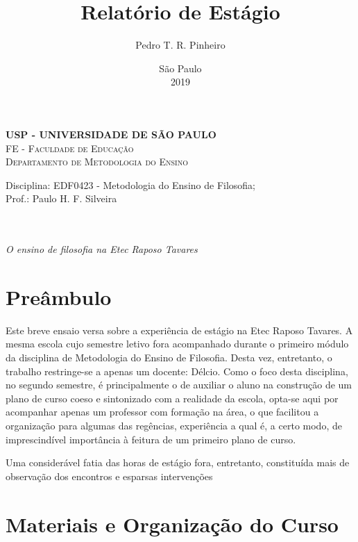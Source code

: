 \documentclass[12pt,a4paper]{article}
\author{Pedro T. R. Pinheiro}
\date{São Paulo\\2019}
\title{Relatório de Estágio}
\newcommand{\subtitulo}{O ensino de filosofia na Etec Raposo Tavares}
\newcommand{\disciplina}{EDF0423 - Metodologia do Ensino de Filosofia}
\newcommand{\departamento}{Departamento de Metodologia do Ensino}
\newcommand{\unidade}{FE - Faculdade de Educação}
\newcommand{\prof}{Paulo H. F. Silveira}
\begin{document}
	\begin{center}
				\textbf{
				\LARGE USP - UNIVERSIDADE DE SÃO PAULO \\
			}
			\Large \textsc{\unidade} \\
			\large \textsc{\departamento}\\
			\vspace*{1cm}
				
			Disciplina: \disciplina; \\Prof.: \prof
			\vfill
			\begin{center}
				{\Large \textsc{\theauthor}} \\ 
				\vspace{1cm}
				\LARGE\textbf{\thetitle} \\
				\Large\emph{\subtitulo}
			\end{center}
			\vfill
			\large\thedate
			\vspace*{1cm}
			\thispagestyle{empty}			
	\end{center}

	\newpage

	\setlength{\parskip}{0.5cm}
	\setlength{\parindent}{1.1cm}
	\onehalfspacing
	
	\section{Preâmbulo}
	
	Este breve ensaio versa sobre a experiência de estágio na Etec Raposo Tavares. A mesma escola cujo semestre letivo fora acompanhado durante o primeiro módulo da disciplina de Metodologia do Ensino de Filosofia. Desta vez, entretanto, o trabalho restringe-se a apenas um docente: Délcio. Como o foco desta disciplina, no segundo semestre, é principalmente o de auxiliar o aluno na construção de um plano de curso coeso e sintonizado com a realidade da escola, opta-se aqui por acompanhar apenas um professor com formação na área, o que facilitou a organização para algumas das regências, experiência a qual é, a certo modo, de imprescindível importância à feitura de um primeiro plano de curso. 
	
	Uma considerável fatia das horas de estágio fora, entretanto, constituída mais de observação dos encontros e esparsas intervenções 
	
	\newpage
	
	\section{Materiais e Organização do Curso}
	
\end{document}
